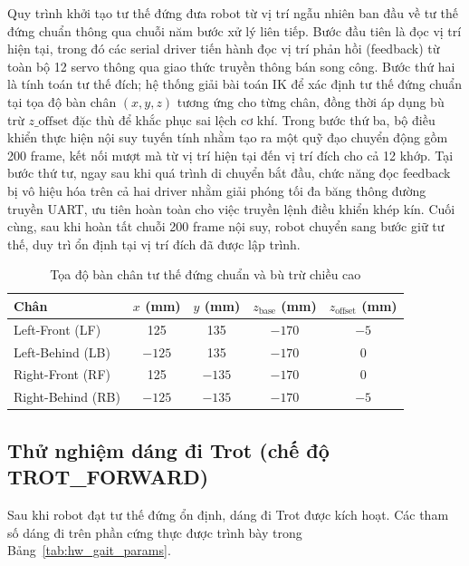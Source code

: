Quy trình khởi tạo tư thế đứng đưa robot từ vị trí ngẫu nhiên ban đầu về tư thế đứng chuẩn thông qua chuỗi năm bước xử lý liên tiếp. Bước đầu tiên là đọc vị trí hiện tại, trong đó các serial driver tiến hành đọc vị trí phản hồi (feedback) từ toàn bộ 12 servo thông qua giao thức truyền thông bán song công. Bước thứ hai là tính toán tư thế đích; hệ thống giải bài toán IK để xác định tư thế đứng chuẩn tại tọa độ bàn chân $(x, y, z)$ tương ứng cho từng chân, đồng thời áp dụng bù trừ $z\_\text{offset}$ đặc thù để khắc phục sai lệch cơ khí. Trong bước thứ ba, bộ điều khiển thực hiện nội suy tuyến tính nhằm tạo ra một quỹ đạo chuyển động gồm 200 frame, kết nối mượt mà từ vị trí hiện tại đến vị trí đích cho cả 12 khớp. Tại bước thứ tư, ngay sau khi quá trình di chuyển bắt đầu, chức năng đọc feedback bị vô hiệu hóa trên cả hai driver nhằm giải phóng tối đa băng thông đường truyền UART, ưu tiên hoàn toàn cho việc truyền lệnh điều khiển khép kín. Cuối cùng, sau khi hoàn tất chuỗi 200 frame nội suy, robot chuyển sang bước giữ tư thế, duy trì ổn định tại vị trí đích đã được lập trình.

\begin{table}[H]
\centering
\caption{Tọa độ bàn chân tư thế đứng chuẩn và bù trừ chiều cao}
\label{tab:homing_targets}
\renewcommand{\arraystretch}{1.3}
\begin{tabular}{|l|c|c|c|c|}
\hline
\textbf{Chân} & $x$ (mm) & $y$ (mm) & $z_{\text{base}}$ (mm) & $z_{\text{offset}}$ (mm) \\ \hline
Left-Front (LF) & 125 & 135 & $-170$ & $-5$ \\ \hline
Left-Behind (LB) & $-125$ & 135 & $-170$ & 0 \\ \hline
Right-Front (RF) & 125 & $-135$ & $-170$ & 0 \\ \hline
Right-Behind (RB) & $-125$ & $-135$ & $-170$ & $-5$ \\ \hline
\end{tabular}
\end{table}



\subsection{Thử nghiệm dáng đi Trot (chế độ TROT\_FORWARD)}

Sau khi robot đạt tư thế đứng ổn định, dáng đi Trot được kích hoạt. Các tham số dáng đi trên phần cứng thực được trình bày trong Bảng~\ref{tab:hw_gait_params}.

